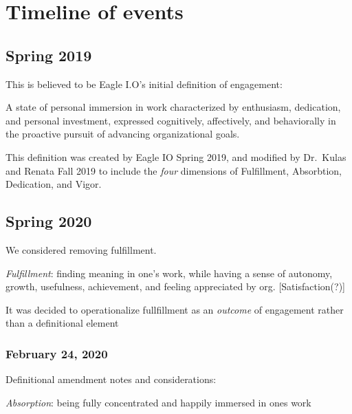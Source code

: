 \documentclass[
]{book}
\begin{document}
\hypertarget{refs}{}

\hypertarget{appendix-appendices}{%
\appendix}


\hypertarget{timeline-of-events}{%
\chapter{Timeline of events}\label{timeline-of-events}}

\hypertarget{spring-2019}{%
\section{Spring 2019}\label{spring-2019}}

This is believed to be Eagle I.O's initial definition of engagement:

A state of personal immersion in work characterized by enthusiasm, dedication, and personal investment, expressed cognitively, affectively, and behaviorally in the proactive pursuit of advancing organizational goals.

This definition was created by Eagle IO Spring 2019, and modified by Dr.~Kulas and Renata Fall 2019 to include the \emph{four} dimensions of Fulfillment, Absorbtion, Dedication, and Vigor.

\hypertarget{spring-2020}{%
\section{Spring 2020}\label{spring-2020}}

We considered removing fulfillment.

\emph{Fulfillment}: finding meaning in one's work, while having a sense of autonomy, growth, usefulness, achievement, and feeling appreciated by org. {[}Satisfaction(?){]}

It was decided to operationalize fullfillment as an \emph{outcome} of engagement rather than a definitional element

\hypertarget{february-24-2020}{%
\subsection{February 24, 2020}\label{february-24-2020}}

Definitional amendment notes and considerations:

\emph{Absorption}: being fully concentrated and happily immersed in ones work \citep[time passes quickly and has difficulty detaching from ones work;][]{schaufeli_measurement_2002}
\end{document}
